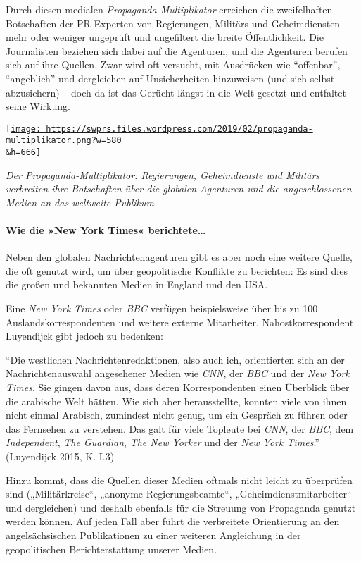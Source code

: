 Durch diesen medialen \emph{Propaganda-Multiplikator} erreichen die
zweifelhaften Botschaften der PR-Experten von Regierungen, Militärs und
Geheimdiensten mehr oder weniger ungeprüft und ungefiltert die breite
Öffentlichkeit. Die Journalisten beziehen sich dabei auf die Agenturen,
und die Agenturen berufen sich auf ihre Quellen. Zwar wird oft versucht,
mit Ausdrücken wie ``offenbar'', ``angeblich'' und dergleichen auf
Unsicherheiten hinzuweisen (und sich selbst abzusichern) -- doch da ist
das Gerücht längst in die Welt gesetzt und entfaltet seine Wirkung.

\href{https://swprs.files.wordpress.com/2019/02/propaganda-multiplikator.png}{\texttt{[image: https://swprs.files.wordpress.com/2019/02/propaganda-multiplikator.png?w=580\\\&h=666]}}

\emph{Der Propaganda-Multiplikator: Regierungen, Geheimdienste und
Militärs verbreiten ihre Bot­schaften über die globalen Agenturen und
die angeschlossenen Medien an das weltweite Publikum.}

\hypertarget{wie-die-new-york-times-berichtete}{%
\paragraph{Wie die »New York Times«
berichtete\ldots{}}\label{wie-die-new-york-times-berichtete}}

Neben den globalen Nachrichtenagenturen gibt es aber noch eine weitere
Quelle, die oft genutzt wird, um über geopolitische Konflikte zu
berichten: Es sind dies die großen und bekannten Medien in England und
den USA.

Eine \emph{New York Times} oder \emph{BBC} verfügen beispielsweise über
bis zu 100 Auslands­korrespondenten und weitere externe Mitarbeiter.
Nahost­korrespondent Luyendijck gibt jedoch zu bedenken:

``Die westlichen Nachrichtenredaktionen, also auch ich, orientierten
sich an der Nachrichten­auswahl angesehener Medien wie \emph{CNN}, der
\emph{BBC} und der \emph{New York Times}. Sie gingen davon aus, dass
deren Korrespondenten einen Überblick über die arabische Welt hätten.
Wie sich aber herausstellte, konnten viele von ihnen nicht einmal
Arabisch, zumindest nicht genug, um ein Gespräch zu führen oder das
Fernsehen zu verstehen. Das galt für viele Topleute bei \emph{CNN}, der
\emph{BBC}, dem \emph{Independent}, \emph{The Guardian}, \emph{The New
Yorker} und der \emph{New York Times}.'' (Luyendijck 2015, K. I.3)

Hinzu kommt, dass die Quellen dieser Medien oftmals nicht leicht zu
überprüfen sind („Militärkreise``, „anonyme Regierungsbeamte``,
„Geheimdienstmitarbeiter`` und dergleichen) und deshalb ebenfalls für
die Streuung von Propaganda genutzt werden können. Auf jeden Fall aber
führt die verbreitete Orientierung an den angelsächsischen Publikationen
zu einer weiteren Angleichung in der geopolitischen Berichterstattung
unserer Medien.

